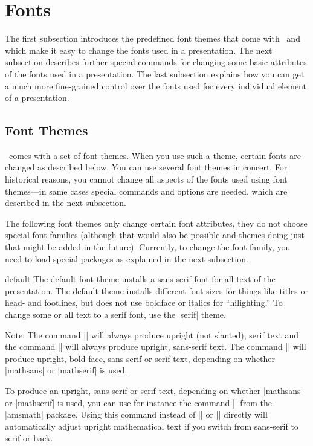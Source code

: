 %
%
%


\section{Fonts}

\label{section-fonts}

The first subsection introduces the predefined font
themes that come with \beamer\ and which make it easy to change the
fonts used in a presentation. The next subsection describes further
special commands for changing some basic attributes of the fonts used in a 
presentation. The last subsection explains how you can get a much more
fine-grained control over the fonts used for every individual element
of a presentation. 





\subsection{Font Themes}

\beamer\ comes with a set of font themes. When you use such a theme,
certain fonts are changed as described below. You can use several font
themes in concert. For historical reasons, you cannot change all
aspects of the fonts used using font themes---in same cases special
commands and options are needed, which are described in the next
subsection.

The following font themes only change certain font attributes, they do
not choose special font families (although that would also be possible
and themes doing just that might be added in the future). Currently,
to change the font family, you need to load special packages as
explained in the next subsection.


\begin{fontthemeexample}{default}
  The default font theme installs a sans serif font for all text of
  the presentation. The default theme installs different font sizes
  for things like titles or head- and footlines, but does not use
  boldface or italics for ``hilighting.'' To change some or all text
  to a serif font, use the |serif| theme.

  Note: The command |\mathrm| will always produce upright (not
  slanted), serif text and the command |\mathsf| will always produce
  upright, sans-serif text. The command |\mathbf| will produce
  upright, bold-face, sans-serif or serif text, depending on whether
  |mathsans| or |mathserif| is used.

  To produce an upright, sans-serif or serif text, depending on
  whether |mathsans| or |mathserif| is used, you can use for instance
  the command |\operatorname| from the |amsmath| package. Using this
  command instead of |\mathrm| or |\mathsf| directly will
  automatically adjust  upright mathematical text if you switch from
  sans-serif to serif or back.
\end{fontthemeexample}

